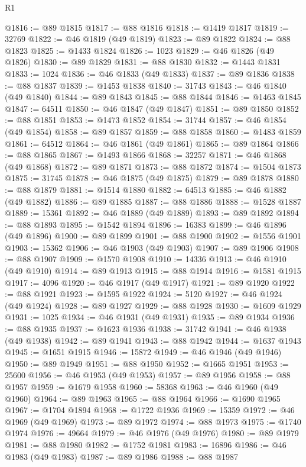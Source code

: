 \begin{lexlean}{R1}
\begin{coremodule}
@1816 := @89 @1815
@1817 := @88 @1816
@1818 := @1419 @1817
@1819 := 32769
@1822 := @46 @1819 (@49 @1819)
@1823 := @89 @1822
@1824 := @88 @1823
@1825 := @1433 @1824
@1826 := 1023
@1829 := @46 @1826 (@49 @1826)
@1830 := @89 @1829
@1831 := @88 @1830
@1832 := @1443 @1831
@1833 := 1024
@1836 := @46 @1833 (@49 @1833)
@1837 := @89 @1836
@1838 := @88 @1837
@1839 := @1453 @1838
@1840 := 31743
@1843 := @46 @1840 (@49 @1840)
@1844 := @89 @1843
@1845 := @88 @1844
@1846 := @1463 @1845
@1847 := 64511
@1850 := @46 @1847 (@49 @1847)
@1851 := @89 @1850
@1852 := @88 @1851
@1853 := @1473 @1852
@1854 := 31744
@1857 := @46 @1854 (@49 @1854)
@1858 := @89 @1857
@1859 := @88 @1858
@1860 := @1483 @1859
@1861 := 64512
@1864 := @46 @1861 (@49 @1861)
@1865 := @89 @1864
@1866 := @88 @1865
@1867 := @1493 @1866
@1868 := 32257
@1871 := @46 @1868 (@49 @1868)
@1872 := @89 @1871
@1873 := @88 @1872
@1874 := @1504 @1873
@1875 := 31745
@1878 := @46 @1875 (@49 @1875)
@1879 := @89 @1878
@1880 := @88 @1879
@1881 := @1514 @1880
@1882 := 64513
@1885 := @46 @1882 (@49 @1882)
@1886 := @89 @1885
@1887 := @88 @1886
@1888 := @1528 @1887
@1889 := 15361
@1892 := @46 @1889 (@49 @1889)
@1893 := @89 @1892
@1894 := @88 @1893
@1895 := @1542 @1894
@1896 := 16383
@1899 := @46 @1896 (@49 @1896)
@1900 := @89 @1899
@1901 := @88 @1900
@1902 := @1556 @1901
@1903 := 15362
@1906 := @46 @1903 (@49 @1903)
@1907 := @89 @1906
@1908 := @88 @1907
@1909 := @1570 @1908
@1910 := 14336
@1913 := @46 @1910 (@49 @1910)
@1914 := @89 @1913
@1915 := @88 @1914
@1916 := @1581 @1915
@1917 := 4096
@1920 := @46 @1917 (@49 @1917)
@1921 := @89 @1920
@1922 := @88 @1921
@1923 := @1595 @1922
@1924 := 5120
@1927 := @46 @1924 (@49 @1924)
@1928 := @89 @1927
@1929 := @88 @1928
@1930 := @1609 @1929
@1931 := 1025
@1934 := @46 @1931 (@49 @1931)
@1935 := @89 @1934
@1936 := @88 @1935
@1937 := @1623 @1936
@1938 := 31742
@1941 := @46 @1938 (@49 @1938)
@1942 := @89 @1941
@1943 := @88 @1942
@1944 := @1637 @1943
@1945 := @1651 @1915
@1946 := 15872
@1949 := @46 @1946 (@49 @1946)
@1950 := @89 @1949
@1951 := @88 @1950
@1952 := @1665 @1951
@1953 := 25600
@1956 := @46 @1953 (@49 @1953)
@1957 := @89 @1956
@1958 := @88 @1957
@1959 := @1679 @1958
@1960 := 58368
@1963 := @46 @1960 (@49 @1960)
@1964 := @89 @1963
@1965 := @88 @1964
@1966 := @1690 @1965
@1967 := @1704 @1894
@1968 := @1722 @1936
@1969 := 15359
@1972 := @46 @1969 (@49 @1969)
@1973 := @89 @1972
@1974 := @88 @1973
@1975 := @1740 @1974
@1976 := 49664
@1979 := @46 @1976 (@49 @1976)
@1980 := @89 @1979
@1981 := @88 @1980
@1982 := @1752 @1981
@1983 := 16896
@1986 := @46 @1983 (@49 @1983)
@1987 := @89 @1986
@1988 := @88 @1987

\end{coremodule}
\end{lexlean}
